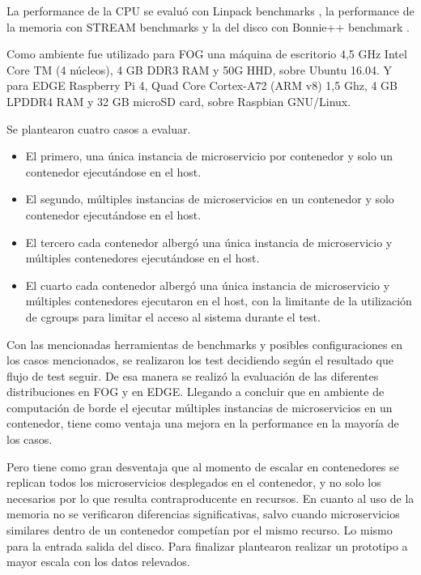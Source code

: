 La performance de la CPU se evaluó con Linpack benchmarks 
\cite{LINPACKBenchmarksWikipedia}, la performance de la memoria con STREAM benchmarks 
\cite{STREAMBenchmarkAMD} 
y la del disco con Bonnie++ benchmark \cite{BonnieWikipedia}.

 Como ambiente fue utilizado para FOG una máquina de escritorio 4,5 GHz Intel Core TM (4 núcleos),
 4 GB DDR3 RAM y 50G HHD, sobre Ubuntu 16.04. Y para EDGE Raspberry Pi 4, Quad Core Cortex-A72 (ARM v8) 1,5 Ghz,
 4 GB LPDDR4 RAM y 32 GB microSD card, sobre Raspbian GNU/Linux. 

 Se plantearon cuatro casos a evaluar.
 \begin{itemize}
     \item El primero, una única instancia de microservicio por contenedor y solo un contenedor ejecutándose en el host.
     \item El segundo, múltiples instancias de microservicios en un contenedor y solo contenedor ejecutándose en el host. 
     \item El tercero cada contenedor albergó una única instancia de microservicio y múltiples contenedores ejecutándose en el host.
     \item El cuarto cada contenedor albergó una única instancia de microservicio y múltiples contenedores ejecutaron en el host, 
     con la limitante de la utilización de cgroups para limitar el acceso al sistema durante el test.
 \end{itemize}
 
 Con las mencionadas herramientas de benchmarks y posibles configuraciones en los casos mencionados,
 se realizaron los test decidiendo según el resultado que flujo de test seguir.
 De esa manera se realizó la evaluación de las diferentes distribuciones en FOG y en EDGE. 
 Llegando a concluir que en ambiente de computación de borde el ejecutar múltiples instancias de microservicios en un contenedor,
 tiene como ventaja una mejora en la performance en la mayoría de los casos.

 Pero tiene como gran desventaja que al momento de escalar en contenedores se replican todos los microservicios desplegados en el contenedor, 
 y no solo los necesarios por lo que resulta contraproducente en recursos. 
 En cuanto al uso de la memoria no se verificaron diferencias significativas, 
 salvo cuando microservicios similares dentro de un contenedor competían por el mismo recurso. 
 Lo mismo para la entrada salida del disco. Para finalizar plantearon realizar un prototipo a mayor escala con los datos relevados.
